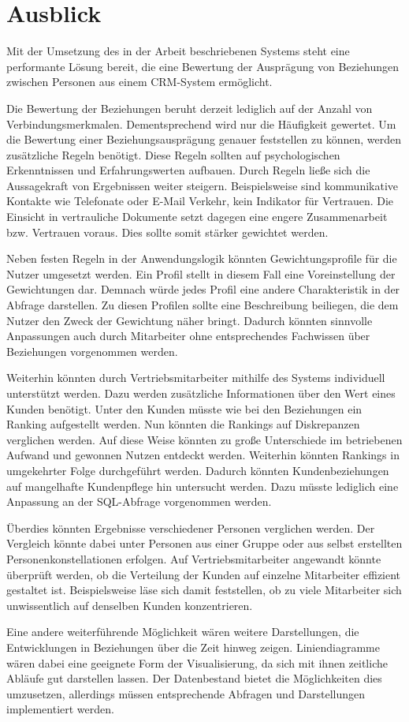 \section{Ausblick}
\label{ch:Ergebnis:sec:Ausblick}

Mit der Umsetzung des in der Arbeit beschriebenen Systems steht eine performante Lösung bereit, die eine Bewertung der Ausprägung von Beziehungen zwischen Personen aus einem CRM-System ermöglicht.

Die Bewertung der Beziehungen beruht derzeit lediglich auf der Anzahl von Verbindungsmerkmalen. Dementsprechend wird nur die Häufigkeit gewertet. Um die Bewertung einer Beziehungsausprägung genauer feststellen zu können, werden zusätzliche Regeln benötigt. Diese Regeln sollten auf psychologischen Erkenntnissen und Erfahrungswerten aufbauen. Durch Regeln ließe sich die Aussagekraft von Ergebnissen weiter steigern. Beispielsweise sind kommunikative Kontakte wie Telefonate oder E-Mail Verkehr, kein Indikator für Vertrauen. Die Einsicht in vertrauliche Dokumente setzt dagegen eine engere Zusammenarbeit bzw. Vertrauen voraus. Dies sollte somit stärker gewichtet werden. 

Neben festen Regeln in der Anwendungslogik könnten Gewichtungsprofile für die Nutzer umgesetzt werden. Ein Profil stellt in diesem Fall eine Voreinstellung der Gewichtungen dar. Demnach würde jedes Profil eine andere Charakteristik in der Abfrage darstellen. Zu diesen Profilen sollte eine Beschreibung beiliegen, die dem Nutzer den Zweck der Gewichtung näher bringt. Dadurch könnten sinnvolle Anpassungen auch durch Mitarbeiter ohne entsprechendes Fachwissen über Beziehungen vorgenommen werden.

Weiterhin könnten durch Vertriebsmitarbeiter mithilfe des Systems individuell unterstützt werden. Dazu werden zusätzliche Informationen über den Wert eines Kunden benötigt. Unter den Kunden müsste wie bei den Beziehungen ein Ranking aufgestellt werden. Nun könnten die Rankings auf Diskrepanzen verglichen werden. Auf diese Weise könnten zu große Unterschiede im betriebenen Aufwand und gewonnen Nutzen entdeckt werden. Weiterhin könnten Rankings in umgekehrter Folge durchgeführt werden. Dadurch könnten Kundenbeziehungen auf mangelhafte Kundenpflege hin untersucht werden. Dazu müsste lediglich eine Anpassung an der SQL-Abfrage vorgenommen werden.

Überdies könnten Ergebnisse verschiedener Personen verglichen werden. Der Vergleich könnte dabei unter Personen aus einer Gruppe oder aus selbst erstellten Personenkonstellationen erfolgen. Auf Vertriebsmitarbeiter angewandt könnte überprüft werden, ob die Verteilung der Kunden auf einzelne Mitarbeiter effizient gestaltet ist. Beispielsweise läse sich damit feststellen, ob zu viele Mitarbeiter sich unwissentlich auf denselben Kunden konzentrieren.

Eine andere weiterführende Möglichkeit wären weitere Darstellungen, die Entwicklungen in Beziehungen über die Zeit hinweg  zeigen. Liniendiagramme wären dabei eine geeignete Form der Visualisierung, da sich mit ihnen zeitliche Abläufe gut darstellen lassen. Der Datenbestand bietet die Möglichkeiten dies umzusetzen, allerdings müssen entsprechende Abfragen und Darstellungen implementiert werden.  
